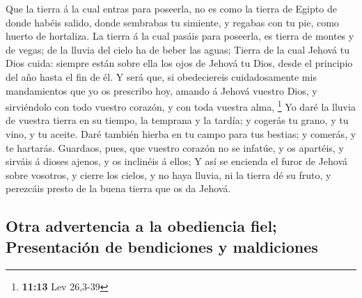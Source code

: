  Que la tierra á la cual entras para poseerla, no es como
la tierra de Egipto de donde habéis salido, donde sembrabas tu simiente,
y regabas con tu pie, como huerto de hortaliza.  La
tierra á la cual pasáis para poseerla, es tierra de montes y de vegas;
de la lluvia del cielo ha de beber las aguas;  Tierra de
la cual Jehová tu Dios cuida: siempre están sobre ella los ojos de
Jehová tu Dios, desde el principio del año hasta el fin de él.
 Y será que, si obedeciereis cuidadosamente mis
mandamientos que yo os prescribo hoy, amando á Jehová vuestro Dios, y
sirviéndolo con todo vuestro corazón, y con toda vuestra alma,
\footnote{\textbf{11:13} Lev 26,3-39}  Yo daré la lluvia
de vuestra tierra en su tiempo, la temprana y la tardía; y cogerás tu
grano, y tu vino, y tu aceite.  Daré también hierba en tu
campo para tus bestias; y comerás, y te hartarás. 
Guardaos, pues, que vuestro corazón no se infatúe, y os apartéis, y
sirváis á dioses ajenos, y os inclinéis á ellos;  Y así
se encienda el furor de Jehová sobre vosotros, y cierre los cielos, y no
haya lluvia, ni la tierra dé su fruto, y perezcáis presto de la buena
tierra que os da Jehová.

\hypertarget{otra-advertencia-a-la-obediencia-fiel-presentaciuxf3n-de-bendiciones-y-maldiciones}{%
\subsection{Otra advertencia a la obediencia fiel; Presentación de
bendiciones y
maldiciones}\label{otra-advertencia-a-la-obediencia-fiel-presentaciuxf3n-de-bendiciones-y-maldiciones}}


